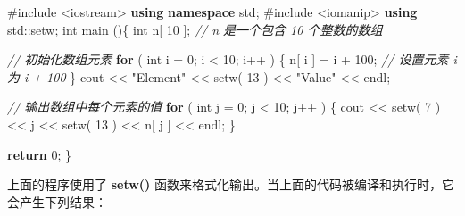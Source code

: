 \documentclass[
]{article}
\newenvironment{Shaded}{}{}
\newcommand{\BuiltInTok}[1]{#1}
\newcommand{\CommentTok}[1]{\textcolor[rgb]{0.38,0.63,0.69}{\textit{#1}}}
\newcommand{\ControlFlowTok}[1]{\textcolor[rgb]{0.00,0.44,0.13}{\textbf{#1}}}
\newcommand{\DataTypeTok}[1]{\textcolor[rgb]{0.56,0.13,0.00}{#1}}
\newcommand{\DecValTok}[1]{\textcolor[rgb]{0.25,0.63,0.44}{#1}}
\newcommand{\ImportTok}[1]{#1}
\newcommand{\KeywordTok}[1]{\textcolor[rgb]{0.00,0.44,0.13}{\textbf{#1}}}
\newcommand{\NormalTok}[1]{#1}
\newcommand{\OperatorTok}[1]{\textcolor[rgb]{0.40,0.40,0.40}{#1}}
\newcommand{\PreprocessorTok}[1]{\textcolor[rgb]{0.74,0.48,0.00}{#1}}
\newcommand{\StringTok}[1]{\textcolor[rgb]{0.25,0.44,0.63}{#1}}
\begin{document}
\begin{Shaded}
\begin{Highlighting}[]
\PreprocessorTok{\#include }\ImportTok{\textless{}iostream\textgreater{}}
\KeywordTok{using} \KeywordTok{namespace}\NormalTok{ std}\OperatorTok{;}
\PreprocessorTok{\#include }\ImportTok{\textless{}iomanip\textgreater{}}
\KeywordTok{using} \BuiltInTok{std::}\NormalTok{setw}\OperatorTok{;}
\DataTypeTok{int}\NormalTok{ main }\OperatorTok{()\{}
   \DataTypeTok{int}\NormalTok{ n}\OperatorTok{[} \DecValTok{10} \OperatorTok{];} \CommentTok{// n 是一个包含 10 个整数的数组}
 
   \CommentTok{// 初始化数组元素          }
   \ControlFlowTok{for} \OperatorTok{(} \DataTypeTok{int}\NormalTok{ i }\OperatorTok{=} \DecValTok{0}\OperatorTok{;}\NormalTok{ i }\OperatorTok{\textless{}} \DecValTok{10}\OperatorTok{;}\NormalTok{ i}\OperatorTok{++} \OperatorTok{)}
   \OperatorTok{\{}
\NormalTok{      n}\OperatorTok{[}\NormalTok{ i }\OperatorTok{]} \OperatorTok{=}\NormalTok{ i }\OperatorTok{+} \DecValTok{100}\OperatorTok{;} \CommentTok{// 设置元素 i 为 i + 100}
   \OperatorTok{\}}
\NormalTok{   cout }\OperatorTok{\textless{}\textless{}} \StringTok{"Element"} \OperatorTok{\textless{}\textless{}}\NormalTok{ setw}\OperatorTok{(} \DecValTok{13} \OperatorTok{)} \OperatorTok{\textless{}\textless{}} \StringTok{"Value"} \OperatorTok{\textless{}\textless{}}\NormalTok{ endl}\OperatorTok{;}
 
   \CommentTok{// 输出数组中每个元素的值                     }
   \ControlFlowTok{for} \OperatorTok{(} \DataTypeTok{int}\NormalTok{ j }\OperatorTok{=} \DecValTok{0}\OperatorTok{;}\NormalTok{ j }\OperatorTok{\textless{}} \DecValTok{10}\OperatorTok{;}\NormalTok{ j}\OperatorTok{++} \OperatorTok{)}
   \OperatorTok{\{}
\NormalTok{      cout }\OperatorTok{\textless{}\textless{}}\NormalTok{ setw}\OperatorTok{(} \DecValTok{7} \OperatorTok{)\textless{}\textless{}}\NormalTok{ j }\OperatorTok{\textless{}\textless{}}\NormalTok{ setw}\OperatorTok{(} \DecValTok{13} \OperatorTok{)} \OperatorTok{\textless{}\textless{}}\NormalTok{ n}\OperatorTok{[}\NormalTok{ j }\OperatorTok{]} \OperatorTok{\textless{}\textless{}}\NormalTok{ endl}\OperatorTok{;}
   \OperatorTok{\}}
 
   \ControlFlowTok{return} \DecValTok{0}\OperatorTok{;}
\OperatorTok{\}}
\end{Highlighting}
\end{Shaded}

上面的程序使用了 \textbf{setw()}
函数来格式化输出。当上面的代码被编译和执行时，它会产生下列结果：
\end{document}
